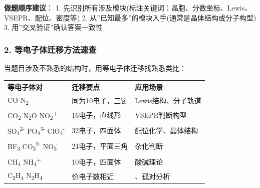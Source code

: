 \textbf{做题顺序建议}：
1. 先识别所有涉及模块(标注关键词：晶胞、分数坐标、Lewis、VSEPR、配位、密度等)
2. 从''已知最多''的模块入手(通常是晶体结构或分子构型)
3. 用''交叉验证''确认答案一致性

\subsubsection{2. 等电子体迁移方法速查}\label{ux7b49ux7535ux5b50ux4f53ux8fc1ux79fbux65b9ux6cd5ux901fux67e5}

当题目涉及不熟悉的结构时，用等电子体迁移找熟悉类比：

{\def\LTcaptype{none} %
\begin{longtable}[]{@{}
  >{\raggedright\arraybackslash}p{}
  >{\raggedright\arraybackslash}p{}
  >{\raggedright\arraybackslash}p{}@{}}
\toprule\noalign{}
\begin{minipage}[b]{\linewidth}\raggedright
等电子体对
\end{minipage} & \begin{minipage}[b]{\linewidth}\raggedright
迁移要点
\end{minipage} & \begin{minipage}[b]{\linewidth}\raggedright
应用场景
\end{minipage} \\
\midrule\noalign{}
\endhead
\bottomrule\noalign{}
\endlastfoot
CO  N\textsubscript{2} & 同为10电子，三键 & Lewis结构、分子轨道 \\
CO\textsubscript{2}  N\textsubscript{2}O  NO\textsubscript{2}\textsuperscript{+} & 16电子，直线形 & VSEPR判断构型 \\
SO\textsubscript{4}\textsuperscript{2-}  PO\textsubscript{4}\textsuperscript{3-}  ClO\textsubscript{4}\textsuperscript{-} & 32电子，四面体 & 配位化学、晶体结构 \\
BF\textsubscript{3}  CO\textsubscript{3}\textsuperscript{2-}  NO\textsubscript{3}\textsuperscript{-} & 24电子，平面三角 & 杂化判断 \\
CH\textsubscript{4}  NH\textsubscript{4}\textsuperscript{+} & 10电子，四面体 & 酸碱理论 \\
C\textsubscript{2}H\textsubscript{4}  N\textsubscript{2}H\textsubscript{4} & 价电子数相近 & 、孤对分析 \\
\end{longtable}
}

